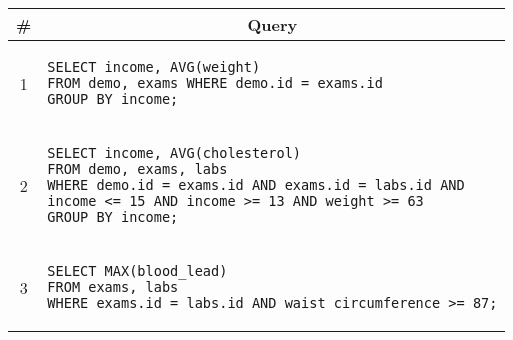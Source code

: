 \begin{tabular}{cl}
\toprule
\# & \multicolumn{1}{c}{Query} \\
\midrule
1 & 
\begin{minipage}{6in}
\begin{lstlisting}[breaklines]
SELECT income, AVG(weight) 
FROM demo, exams WHERE demo.id = exams.id 
GROUP BY income;
\end{lstlisting}
\end{minipage}{queryno} \label{q1} \\
2 & 
\begin{minipage}{6in}
\begin{lstlisting}[breaklines]
SELECT income, AVG(cholesterol) 
FROM demo, exams, labs 
WHERE demo.id = exams.id AND exams.id = labs.id AND
income <= 15 AND income >= 13 AND weight >= 63 
GROUP BY income;
\end{lstlisting}
\end{minipage}
{queryno} \label{q2} \\
3 & 
\begin{minipage}{6in}
\begin{lstlisting}[breaklines]
SELECT MAX(blood_lead) 
FROM exams, labs 
WHERE exams.id = labs.id AND waist_circumference >= 87;
\end{lstlisting}
\end{minipage}{queryno} \label{q3}\\
\bottomrule
\end{tabular}
